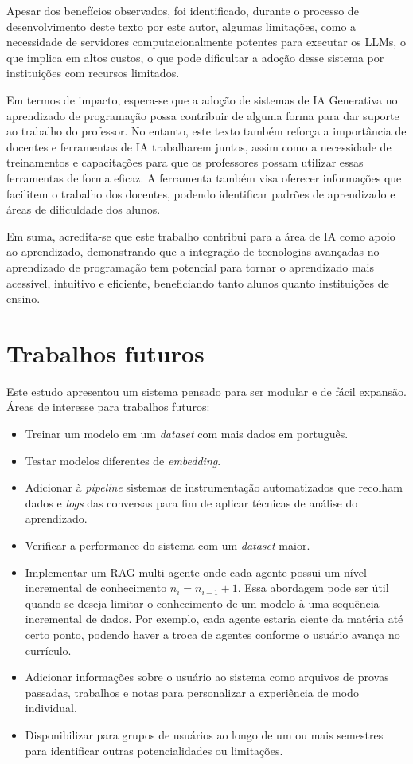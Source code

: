 \documentclass[journal]{IEEEtran}
\begin{document}
Apesar dos benefícios observados, foi identificado, durante o processo de desenvolvimento deste texto por este autor, algumas limitações, como a necessidade de servidores computacionalmente potentes para executar os LLMs, o que implica em altos custos, o que pode dificultar a adoção desse sistema por instituições com recursos limitados.

Em termos de impacto, espera-se que a adoção de sistemas de IA Generativa no aprendizado de programação possa contribuir de alguma forma para dar suporte ao trabalho do professor.
No entanto, este texto também reforça a importância de docentes e ferramentas de IA trabalharem juntos, assim como a necessidade de treinamentos e capacitações para que os professores possam utilizar essas ferramentas de forma eficaz.
A ferramenta também visa oferecer informações que facilitem o trabalho dos docentes, podendo identificar padrões de aprendizado e áreas de dificuldade dos alunos.

Em suma, acredita-se que este trabalho contribui para a área de IA como apoio ao aprendizado, demonstrando que a integração de tecnologias avançadas no aprendizado de programação tem potencial para tornar o aprendizado mais acessível, intuitivo e eficiente, beneficiando tanto alunos quanto instituições de ensino.

\section{Trabalhos futuros\label{sec:trabs_futuros}}

\noindent%
Este estudo apresentou um sistema pensado para ser modular e de fácil expansão.
Áreas de interesse para trabalhos futuros:

\begin{itemize}
    \item Treinar um modelo em um \textit{dataset} com mais dados em português.
    \item Testar modelos diferentes de \textit{embedding}.
    \item Adicionar à \textit{pipeline} sistemas de instrumentação automatizados que recolham dados e \textit{logs} das conversas para fim de aplicar técnicas de análise do aprendizado.
    \item Verificar a performance do sistema com um \textit{dataset} maior.
    \item Implementar um RAG multi-agente onde cada agente possui um nível incremental de conhecimento $n_{i} = n_{i-1} + 1$.
    Essa abordagem pode ser útil quando se deseja limitar o conhecimento de um modelo à uma sequência incremental de dados.
    Por exemplo, cada agente estaria ciente da matéria até certo ponto, podendo haver a troca de agentes conforme o usuário avança no currículo.
    \item Adicionar informações sobre o usuário ao sistema como arquivos de provas passadas, trabalhos e notas para personalizar a experiência de modo individual.
    \item Disponibilizar para grupos de usuários ao longo de um ou mais semestres para identificar outras potencialidades ou limitações.
\end{itemize}
\end{document}
